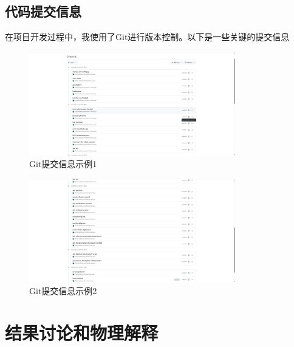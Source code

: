 \documentclass[UTF8]{ctexart}
\begin{document}
\subsection{代码提交信息}
在项目开发过程中，我使用了Git进行版本控制。以下是一些关键的提交信息
\begin{figure}[H]
    \centering
    \includegraphics[width=0.8\textwidth]{c1.png}
    \caption{Git提交信息示例1}
    \label{fig:git_commit_info1}
\end{figure}
\begin{figure}
    \centering
    \includegraphics[width=0.8\textwidth]{c2.png}
    \caption{Git提交信息示例2}
    \label{fig:git_commit_info2}
\end{figure}


\section{结果讨论和物理解释}
\end{document}
